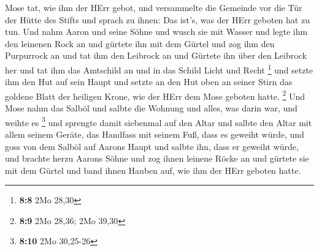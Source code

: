  Mose tat, wie ihm der HErr gebot, und versammelte die
Gemeinde vor die Tür der Hütte des Stifts  und sprach zu
ihnen: Das ist's, was der HErr geboten hat zu tun.  Und nahm
Aaron und seine Söhne und wusch sie mit Wasser  und legte
ihm den leinenen Rock an und gürtete ihn mit dem Gürtel und zog ihm den
Purpurrock an und tat ihm den Leibrock an und Gürtete ihn über den
Leibrock her  und tat ihm das Amtschild an und in das Schild
Licht und Recht \footnote{\textbf{8:8} 2Mo 28,30}  und
setzte ihm den Hut auf sein Haupt und setzte an den Hut oben an seiner
Stirn das goldene Blatt der heiligen Krone, wie der HErr dem Mose
geboten hatte. \footnote{\textbf{8:9} 2Mo 28,36; 2Mo 39,30}
 Und Mose nahm das Salböl und salbte die Wohnung und alles,
was darin war, und weihte es \footnote{\textbf{8:10} 2Mo 30,25-26}
 und sprengte damit siebenmal auf den Altar und salbte den
Altar mit allem seinem Geräte, das Handfass mit seinem Fuß, dass es
geweiht würde,  und goss von dem Salböl auf Aarons Haupt
und salbte ihn, dass er geweiht würde,  und brachte herzu
Aarons Söhne und zog ihnen leinene Röcke an und gürtete sie mit dem
Gürtel und band ihnen Hauben auf, wie ihm der HErr geboten hatte.

